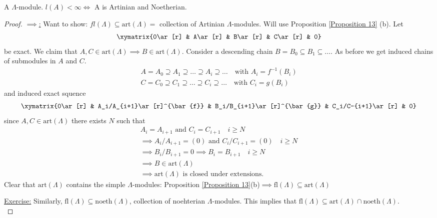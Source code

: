 \begin{prop}
A \(\Lambda\)-module. \(l(A) < \infty \Leftrightarrow\) A is  Artinian and Noetherian.
\end{prop}
\begin{proof}\underline{\(\implies\):} Want to show: \(fl(\Lambda) \subseteq \text{art}(\Lambda) = \) collection of Artinian \(\Lambda\)-modules. Will use Proposition \ref{Proposition 13} (b). Let 
\begin{align*}
    \xymatrix{0\ar[r] & A\ar[r] & B\ar[r] & C\ar[r] & 0}
\end{align*}
be exact. We claim that \(A, C\in\text{art}(\Lambda) \implies B\in\text{art}(\Lambda)\). Consider a descending chain \( B = B_0 \subseteq B_1 \subseteq \dots\). As before we get induced chains of submodules in \(A\) and \(C\). 
\begin{gather*}
    A = A_0 \supseteq A_1 \supseteq\dots\supseteq A_i\supseteq\dots\quad\text{with } A_i = f^{-1}(B_i)\\
    C = C_0 \supseteq C_1 \supseteq\dots\supseteq C_i\supseteq\dots\quad\text{with } C_i = g(B_i)
\end{gather*}
and induced exact squence
\begin{align*}
    \xymatrix{0\ar[r] & A_i/A_{i+1}\ar[r]^{\bar{f}} & B_i/B_{i+1}\ar[r]^{\bar{g}} & C_i/C-{i+1}\ar[r] & 0}
\end{align*}
since \(A, C\in\text{art}(\Lambda)\) there exists \(N\) such that
\begin{gather*}
A_i = A_{i+1} \text{ and } C_i = C_{i+1}\quad i\geq N\\
\implies A_i/A_{i+1} = (0) \text{ and } C_i/C_{i+1} = (0) \quad i \geq N \\
\implies B_i/B_{i+1} = 0 \implies B_i = B_{i+1} \quad i\geq N\\
\implies B\in\text{art}(\Lambda) \\
\implies \text{art}(\Lambda) \text{ is closed under extensions.}
\end{gather*}
Clear that \(\text{art}(\Lambda)\) contains the simple \(\Lambda\)-modules: Proposition \ref{Proposition 13}(b)\(\implies  \text{fl}(\Lambda)\subseteq\text{art}(\Lambda)\)

\noindent\underline{Exercise:} Similarly, \(\text{fl}(\Lambda)\subseteq\text{noeth}(\Lambda)\), collection of noehterian \(\Lambda\)-modules. This implies that \(\text{fl}(\Lambda)\subseteq\text{art}(\Lambda)\cap\text{noeth}(\Lambda)\).\\[0.5cm]


\end{proof}
